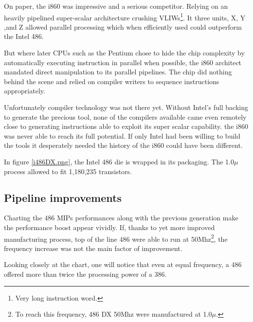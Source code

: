 On paper, the i860 was impressive and a serious competitor. Relying on an heavily pipelined super-scalar architecture crushing VLIWs\footnote{Very long instruction word.}. It three units, X, Y ,and Z allowed parallel processing which when efficiently used could outperform the Intel 486.\\
\par
But where later CPUs such as the Pentium chose to hide the chip complexity by automatically executing instruction in parallel when possible, the i860 architect mandated direct manipulation to its parallel pipelines. The chip did nothing behind the scene and relied on compiler writers to sequence instructions appropriately.\\
\par
Unfortunately compiler technology was not there yet. Without Intel's full backing to generate the precious tool, none of the compilers available came even remotely close to generating instructions able to exploit its super scalar capability. the i860 was never able to reach its full potential. If only Intel had been willing to build the tools it desperately needed the history of the i860 could have been different.\\
\par
\par
{}
\par
In figure \ref{i486DX.png}, the Intel 486 die is wrapped in its packaging. The 1.0$\mu$ process allowed to fit 1,180,235 transistors.\\
\par
{}

\par
\subsection{Pipeline improvements}
Charting the 486 MIPs performances along with the previous generation make the performance boost appear vividly. If, thanks to yet more improved manufacturing process, top of the line 486 were able to run at 50Mhz\footnote{To reach this frequency, 486 DX 50Mhz were manufactured at 1.0$\mu$.}, the frequency increase was not the main factor of improvement.\\
\par
 Looking closely at the chart, one will notice that even at equal frequency, a 486 offered more than twice the processing power of a 386.\\

